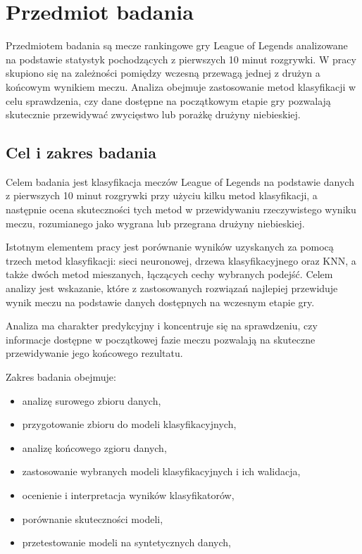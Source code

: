 \documentclass[twoside]{customStyle}
\begin{document}
\section{Przedmiot badania}

Przedmiotem badania są mecze rankingowe gry League of Legends analizowane na podstawie statystyk pochodzących z pierwszych 10 minut rozgrywki. W pracy skupiono się na zależności pomiędzy wczesną przewagą jednej z drużyn a końcowym wynikiem meczu. Analiza obejmuje zastosowanie metod klasyfikacji w celu sprawdzenia, czy dane dostępne na początkowym etapie gry pozwalają skutecznie przewidywać zwycięstwo lub porażkę drużyny niebieskiej.

\subsection{Cel i zakres badania}
Celem badania jest klasyfikacja meczów League of Legends na podstawie danych z
pierwszych 10 minut rozgrywki przy użyciu kilku metod klasyfikacji, a następnie ocena
skuteczności tych metod w przewidywaniu rzeczywistego wyniku meczu, rozumianego
jako wygrana lub przegrana drużyny niebieskiej.

Istotnym elementem pracy jest porównanie wyników uzyskanych za pomocą trzech
metod klasyfikacji: sieci neuronowej, drzewa klasyfikacyjnego oraz KNN,
a także dwóch metod mieszanych, łączących cechy wybranych podejść.
Celem analizy jest wskazanie, które z zastosowanych rozwiązań najlepiej przewiduje wynik
meczu na podstawie danych dostępnych na wczesnym etapie gry.

Analiza ma charakter predykcyjny i koncentruje się na sprawdzeniu, czy informacje
dostępne w początkowej fazie meczu pozwalają na skuteczne przewidywanie jego końcowego
rezultatu.

Zakres badania obejmuje:
\begin{itemize}
\item analizę surowego zbioru danych,
\item przygotowanie zbioru do modeli klasyfikacyjnych,
\item analizę końcowego zgioru danych,
\item zastosowanie wybranych modeli klasyfikacyjnych i ich walidacja,
\item ocenienie i interpretacja wyników klasyfikatorów,
\item porównanie skuteczności modeli,
\item przetestowanie modeli na syntetycznych danych,
\end{itemize}
\end{document}

